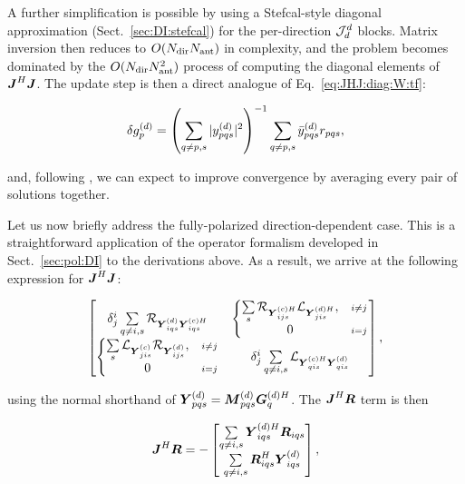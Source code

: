 \documentclass[useAMS,usenatbib]{mn2e}
\newcommand{\mat}[1]{{\bmath{#1}}}
\newcommand{\JJ}{\mat{J}} %
\newcommand{\RR}{\mat{R}}
\newcommand{\JHJ}{\JJ^H\JJ} %
\begin{document}
A further simplification is possible by using a Stefcal-style diagonal approximation (Sect.~\ref{sec:DI:stefcal}) for
the per-direction $\mathcal{J}^d_d$ blocks. Matrix inversion then reduces to $O(N_\mathrm{dir}N_\mathrm{ant})$ in complexity, and the problem becomes dominated by
the $O(N_\mathrm{dir}N_\mathrm{ant}^2)$ process of computing the diagonal elements of $\JHJ$. The update step is then a direct analogue of
Eq.~\ref{eq:JHJ:diag:W:tf}:

\begin{equation}
\delta g^{(d)}_p = \left( \sum\limits_{q\ne p,s} |y^{(d)}_{pqs}|^2  \right )^{-1} \sum\limits_{q\ne p,s} \bar{y}^{(d)}_{pqs} r_{pqs},
\end{equation}

and, following \citet{Stefcal}, we can expect to improve convergence by averaging every pair of solutions together.

Let us now briefly address the fully-polarized direction-dependent case. This is a straightforward application of
the operator formalism developed in Sect.~\ref{sec:pol:DI} to the derivations above. As a result, we arrive at the
following expression for $\JHJ$:

\begin{equation}
\label{eq:JHJ:DD:pol}
\Matrix{cc}{
  \delta^i_j \sum\limits_{q\ne i,s} \Rop{\YYd_{iqs} \YYcH_{iqs}} & 
  \left \{ 
  \begin{array}{@{}cc@{}}
   \sum\limits_{s} \Rop{ \YYcH_{ijs}  } \Lop{\YYdH_{jis}},&{\scriptstyle i\ne j} \\
   0 &{\scriptstyle i=j}
  \end{array} \right . 
  \\
  \left \{ 
  \begin{array}{@{}cc@{}}
   \sum\limits_{s} \Lop{ \YYc_{jis}  } \Rop{\YYd_{ijs}},&{\scriptstyle i\ne j} \\
   0 &{\scriptstyle i=j}
  \end{array} \right . 
  &
  \delta^i_j \sum\limits_{q\ne i,s} \Lop{\YYcH_{qis}\YYd_{qis}}
},
\end{equation}

using the normal shorthand of $\YYd_{pqs} = \MMd_{pqs} \GGdH_q$. The $\JJ^H\bmath{R}$ term is then

\begin{equation}
\label{eq:JHR:DD:pol}
\JJ^H\bmath{R} = -\Matrix{c}{
\sum\limits_{q\ne i,s} \YYdH_{iqs} \RR_{iqs} \\
\sum\limits_{q\ne i,s} \RR^H_{iqs} \YYd_{iqs}  },
\end{equation}
\end{document}
